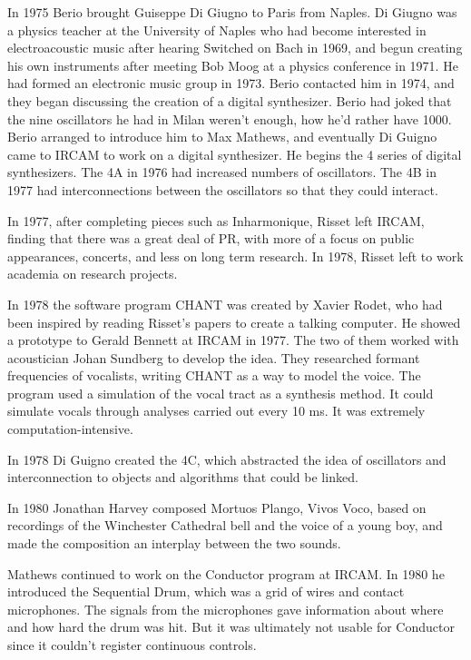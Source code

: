 In 1975 Berio brought Guiseppe Di Giugno to Paris from Naples. Di Giugno was a physics teacher at the University of Naples who had become interested in electroacoustic music after hearing Switched on Bach in 1969, and begun creating his own instruments after meeting Bob Moog at a physics conference in 1971. He had formed an electronic music group in 1973. Berio contacted him in 1974, and they began discussing the creation of a digital synthesizer. Berio had joked that the nine oscillators he had in Milan weren't enough, how he'd rather have 1000. Berio arranged to introduce him to Max Mathews, and eventually Di Guigno came to IRCAM to work on a digital synthesizer. He begins the 4 series of digital synthesizers. The 4A in 1976 had increased numbers of oscillators. The 4B in 1977 had interconnections between the oscillators so that they could interact.

In 1977, after completing pieces such as Inharmonique, Risset left IRCAM, finding that there was a great deal of PR, with more of a focus on public appearances, concerts, and less on long term research. In 1978, Risset left to work academia on research projects.

In 1978 the software program CHANT was created by Xavier Rodet, who had been inspired by reading Risset's papers to create a talking computer. He showed a prototype to Gerald Bennett at IRCAM in 1977. The two of them worked with acoustician Johan Sundberg to develop the idea. They researched formant frequencies of vocalists, writing CHANT as a way to model the voice. The program used a simulation of the vocal tract as a synthesis method. It could simulate vocals through analyses carried out every 10 ms. It was extremely computation-intensive.

In 1978 Di Guigno created the 4C, which abstracted the idea of oscillators and interconnection to objects and algorithms that could be linked.

In 1980 Jonathan Harvey composed Mortuos Plango, Vivos Voco, based on recordings of the Winchester Cathedral bell and the voice of a young boy, and made the composition an interplay between the two sounds.

Mathews continued to work on the Conductor program at IRCAM. In 1980 he introduced the Sequential Drum, which was a grid of wires and contact microphones. The signals from the microphones gave information about where and how hard the drum was hit. But it was ultimately not usable for Conductor since it couldn't register continuous controls.


